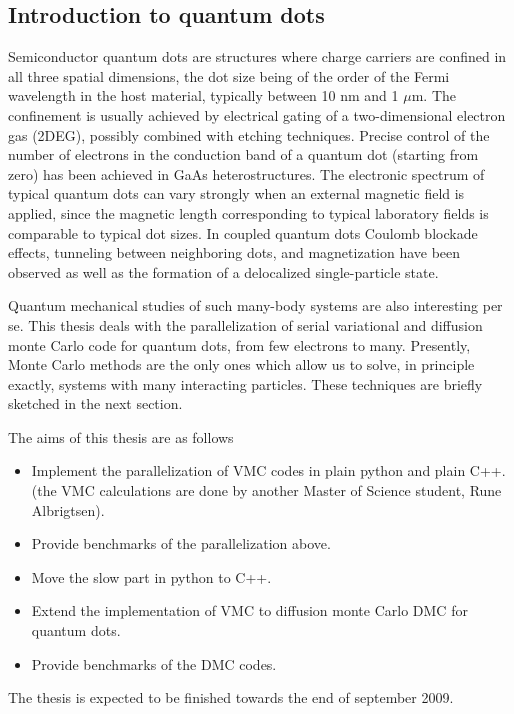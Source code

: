 \subsection*{Introduction to quantum dots}

Semiconductor quantum dots are structures where
charge carriers are confined in all three spatial dimensions, 
the dot size being of the order of the Fermi wavelength 
in the host material, typically between  10 nm and  1 $\mu$m.
The confinement is usually achieved by electrical gating of a 
two-dimensional electron gas (2DEG), 
possibly combined with etching techniques. Precise control of the
number of electrons in the conduction band of a quantum dot 
(starting from zero) has been achieved in GaAs heterostructures. 
The electronic spectrum of typical quantum dots
can vary strongly when an external magnetic field is applied, 
since the magnetic length corresponding to typical 
laboratory fields  is comparable to typical dot sizes.
In coupled quantum dots Coulomb blockade effects, 
tunneling between neighboring dots, and magnetization 
have been observed as well as the formation of a
delocalized single-particle state. 


Quantum mechanical studies of such many-body systems are also
interesting per se. 
This thesis deals with the parallelization of serial variational and diffusion 
monte Carlo code for quantum dots, from few electrons to many.
Presently, Monte Carlo methods are
the only ones which allow us to solve, in principle exactly, 
systems with many interacting particles. These techniques are briefly sketched 
in the next section.




The aims of this thesis are as follows

\begin{itemize}
\item Implement the parallelization of VMC codes in plain python and plain C++.
(the VMC calculations are done by another Master of Science student, Rune Albrigtsen).
\item Provide benchmarks of the parallelization above.
\item Move the slow part in python to C++.
\item Extend the implementation of VMC to diffusion monte Carlo DMC for quantum dots. 
\item Provide benchmarks of the DMC codes.


\end{itemize}



The thesis is expected to be finished towards the end  of september 2009.



